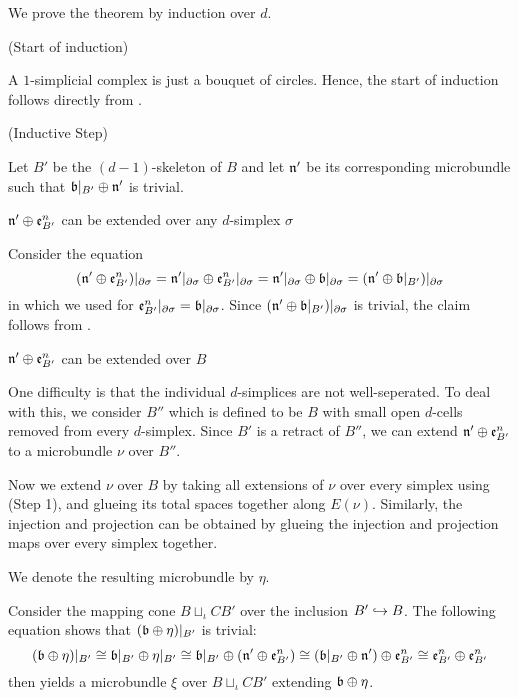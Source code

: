 \begin{myproof}
    We prove the theorem by induction over $d$.

    (Start of induction)

    A $1$-simplicial complex is just a bouquet of circles.
    Hence, the start of induction follows directly from .   

    (Inductive Step)

    Let $B'$ be the $(d - 1)$-skeleton of $B$ and let $\mathfrak{n}'$ be its corresponding microbundle
    such that $\whitney{\bb[B']}{\bn'}$ is trivial.

    \begin{steps}
        \item $\mathfrak{n}' \oplus{} \mathfrak{e}^{n}_{B'}$ can be extended over any $d$-simplex $\sigma$

        Consider the equation
        \[
            (\whitney{\bn'}{\be{B'}})\restr{\partial\sigma}
            = \whitney{\bn'\restr{\partial\sigma}}{\be{B'}\restr{\partial\sigma}}
            = \whitney{\bn'\restr{\partial\sigma}}{\bb[\partial\sigma]}
            = (\whitney{\bn'}{\bb[B']})\restr{\partial\sigma}
        \]
        in which we used 
        for $\be{B'}\restr{\partial\sigma} = \bb[\partial\sigma]$.
        Since $(\whitney{\bn'}{\bb[B']})\restr{\partial\sigma}$ is trivial, the claim follows from .

        \item $\mathfrak{n}' \oplus{} \mathfrak{e}^{n}_{B'}$ can be extended over $B$

        One difficulty is that the individual $d$-simplices are not well-seperated.
        To deal with this, we consider $B''$ which is defined to be $B$
        with small open $d$-cells removed from every $d$-simplex.
        Since $B'$ is a retract of $B''$, we can extend $\mathfrak{n}' \oplus{} \mathfrak{e}^{n}_{B'}$ to a microbundle $\nu$ over $B''$.

        Now we extend $\nu$ over $B$ by taking all extensions of $\nu$
        over every simplex
        using (Step 1), and glueing its total spaces together along $E(\nu)$.
        Similarly, the injection and projection can be obtained
        by glueing the injection and projection maps over every simplex together.

        We denote the resulting microbundle by $\eta$.

        \item \blankbreak{}
        Consider the mapping cone $B \sqcup_\iota CB'$ over the inclusion $B' \hookrightarrow{} B$.
        The following equation shows that $(\whitney{\bb}{\eta})\restr{B'}$ is trivial:
        \[
            (\whitney{\bb}{\eta})\restr{B'}
            \cong \whitney{\bb[B']}{\eta\restr{B'}}
            \cong \whitney{\bb[B']}{(\whitney{\bn'}{\be{B'}})}
            \cong \whitney{(\whitney{\bb[B']}{\bn'})}{\be{B'}}
            \cong \whitney{\be{B'}}{\be{B'}}
        \]
         then yields a microbundle $\xi$ over $B \sqcup_\iota CB'$
        extending $\whitney{\bb}{\eta}$.


\end{steps}
\end{myproof}
